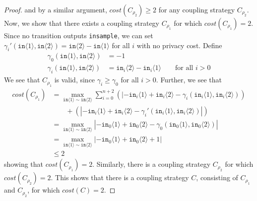 \documentclass[12pt]{article}
\newcommand{\brangle}[1]{\langle #1 \rangle}
\theoremstyle{definition}
\begin{document}
\begin{proof}
    and by a similar argument, $cost(C_{\rho_2})\geq 2$ for any coupling strategy $C_{\rho_2}$. Now, we show that there exists a coupling strategy $C_{\rho_1}$ for which $cost(C_{\rho_1}) = 2$. Since no transition outputs \texttt{insample}, we can set $\gamma_i'(\texttt{in}\brangle{1}, \texttt{in}\brangle{2}) = \texttt{in}\brangle{2} - \texttt{in}\brangle{1}$ for all $i$ with no privacy cost. Define 
    \begin{align*}
        \gamma_0(\texttt{in}\brangle{1}, \texttt{in}\brangle{2}) &= -1 \\
        \gamma_i(\texttt{in}\brangle{1}, \texttt{in}\brangle{2}) &= \texttt{in}_i\brangle{2} - \texttt{in}_i\brangle{1} \qquad \text{for all $i>0$}
    \end{align*}
    We see that $C_{\rho_1}$ is valid, since $\gamma_i\geq \gamma_{0}$ for all $i>0$. Further, we see that 
    \begin{align*}
        cost(C_{\rho_1}) &= \max_{\texttt{in}\brangle{1}\sim\texttt{in}\brangle{2}}\sum_{i=0}^{n+2}(|-\texttt{in}_i\brangle{1}+\texttt{in}_i\brangle{2}-\gamma_i(\texttt{in}_i\brangle{1}, \texttt{in}_i\brangle{2}))\\&\qquad+(|-\texttt{in}_i\brangle{1}+\texttt{in}_i\brangle{2}-\gamma_i'(\texttt{in}_i\brangle{1}, \texttt{in}_i\brangle{2})|)\\
        &= \max_{\texttt{in}\brangle{1}\sim\texttt{in}\brangle{2}} |-\texttt{in}_0\brangle{1}+\texttt{in}_0\brangle{2}-\gamma_0(\texttt{in}_0\brangle{1}, \texttt{in}_0\brangle{2})| \\
        &= \max_{\texttt{in}\brangle{1}\sim\texttt{in}\brangle{2}} |-\texttt{in}_0\brangle{1}+\texttt{in}_0\brangle{2}+1|\\
        &\leq 2 
    \end{align*}
    showing that $cost(C_{\rho_1}) = 2$. Similarly, there is a coupling strategy $C_{\rho_2}$ for which $cost(C_{\rho_2}) = 2$. This shows that there is a coupling strategy $C$, consisting of $C_{\rho_1}$ and $C_{\rho_2}$, for which $cost(C) = 2$.


\end{proof}
\end{document}
